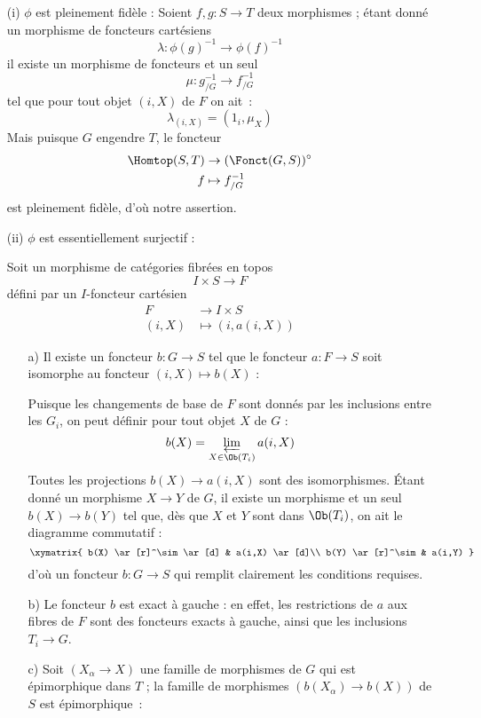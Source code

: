 \begin{enumerate}
    \item[(i)] $\phi$ est pleinement fidèle : 
    Soient $f, g: S \to T$ deux morphismes ; étant donné un morphisme de foncteurs cartésiens
    $$
    \lambda: \phi(g)^{-1} \to \phi(f)^{-1}
    $$
    il existe un morphisme de foncteurs et un seul
    $$
    \mu: g^{-1}_{/G} \to f^{-1}_{/G}
    $$
    tel que pour tout objet $(i, X)$ de $F$ on ait~: 
    $$
    \lambda_{(i, X)} = (1_i, \mu_X)
    $$
    Mais puisque $G$ engendre $T$, le foncteur
    \begin{align*}
    \Homtop(S, T) & \to (\Fonct(G, S))^\circ \\
    f & \mapsto f^{-1}_{/G}
    \end{align*}
    est pleinement fidèle, d'où notre assertion.
    \item[(ii)] $\phi$ est essentiellement surjectif : 
    
    Soit un morphisme de catégories fibrées en topos
    $$
    I \times S \to F
    $$
    défini par un $I$-foncteur cartésien
    \begin{align*}
    F &\to I \times S\\
    (i, X) & \mapsto (i, a(i, X))
    \end{align*}
    \begin{enumerate}
        \item[a)] Il existe un foncteur $b: G \to S$ tel que le foncteur $a: F \to S$ soit isomorphe au foncteur $(i, X) \mapsto b(X)$ :
        
        Puisque les changements de base de $F$ sont donnés par les inclusions entre les $G_i$, on peut définir pour tout objet $X$ de $G$ :
        $$
        b(X) = \varprojlim_{X \in \Ob(T_i)} a(i, X)
        $$
    Toutes les projections $b(X) \to a(i, X)$ sont des isomorphismes. Étant donné un morphisme $X \to Y$ de $G$, il existe un morphisme et un seul $b(X) \to b(Y)$ tel que, dès que $X$ et $Y$ sont dans $\Ob(T_i)$, on ait le diagramme commutatif :
    $$
        \xymatrix{
            b(X) \ar[r]^\sim \ar[d] & a(i,X) \ar[d]\\
            b(Y) \ar[r]^\sim & a(i,Y)
        }
    $$
     d'où un foncteur $b: G\to S$ qui remplit clairement les conditions requises.
     \item[b)] Le foncteur $b$ est exact à gauche : en effet, les restrictions de $a$ aux fibres de $F$ sont des foncteurs exacts à gauche, ainsi que les inclusions $T_i \to G$.
     \item[c)] Soit $(X_\alpha \to X)$ une famille de morphismes de $G$ qui est épimorphique dans $T$ ; la famille de morphismes $(b(X_\alpha) \to b(X))$ de $S$ est épimorphique~:
     

\end{enumerate}
\end{enumerate}
